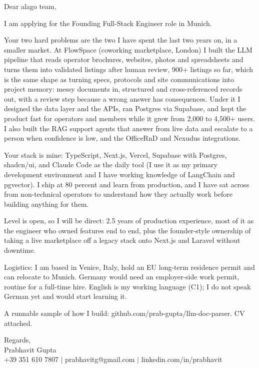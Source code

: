 \documentclass[a4paper,11pt]{article}
\begin{document}
Dear alago team,

I am applying for the Founding Full-Stack Engineer role in Munich.

Your two hard problems are the two I have spent the last two years on, in a smaller market. At FlowSpace (coworking marketplace, London) I built the LLM pipeline that reads operator brochures, websites, photos and spreadsheets and turns them into validated listings after human review, 900+ listings so far, which is the same shape as turning specs, protocols and site communications into project memory: messy documents in, structured and cross-referenced records out, with a review step because a wrong answer has consequences. Under it I designed the data layer and the APIs, ran Postgres via Supabase, and kept the product fast for operators and members while it grew from 2,000 to 4,500+ users. I also built the RAG support agents that answer from live data and escalate to a person when confidence is low, and the OfficeRnD and Nexudus integrations.

Your stack is mine: TypeScript, Next.js, Vercel, Supabase with Postgres, shadcn/ui, and Claude Code as the daily tool (I use it as my primary development environment and I have working knowledge of LangChain and pgvector). I ship at 80 percent and learn from production, and I have sat across from non-technical operators to understand how they actually work before building anything for them.

Level is open, so I will be direct: 2.5 years of production experience, most of it as the engineer who owned features end to end, plus the founder-style ownership of taking a live marketplace off a legacy stack onto Next.js and Laravel without downtime.

Logistics: I am based in Venice, Italy, hold an EU long-term residence permit and can relocate to Munich. Germany would need an employer-side work permit, routine for a full-time hire. English is my working language (C1); I do not speak German yet and would start learning it.

A runnable sample of how I build: github.com/prab-gupta/llm-doc-parser. CV attached.

Regards,\\
Prabhavit Gupta\\
+39 351 610 7807 $\vert$ prabhavitg@gmail.com $\vert$ linkedin.com/in/prabhavit
\end{document}
